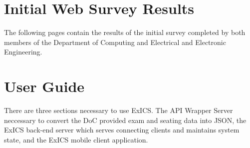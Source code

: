 \label{ch:appendix}

\chapter{Initial Web Survey Results}
\label{ch:survey_results}

The following pages contain the results of the initial survey completed by both members of the Department of Computing and Electrical and Electronic Engineering.




\chapter{User Guide}
\label{ch:user_guide}

There are three sections necessary to use ExICS.  The API Wrapper Server neccessary to convert the DoC provided exam and seating data into JSON, the ExICS back-end server which serves connecting clients and maintains system state, and the ExICS mobile client application.